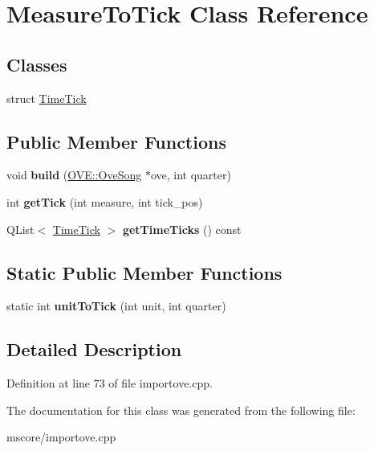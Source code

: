 \hypertarget{class_measure_to_tick}{}\section{Measure\+To\+Tick Class Reference}
\label{class_measure_to_tick}
\subsection*{Classes}
\begin{DoxyCompactItemize}
\item 
struct \hyperlink{struct_measure_to_tick_1_1_time_tick}{Time\+Tick}
\end{DoxyCompactItemize}
\subsection*{Public Member Functions}
\begin{DoxyCompactItemize}
\item 
\mbox{\label{class_measure_to_tick_a9a891a30319eabf0fb2f07f47308f732}} 
void {\bfseries build} (\hyperlink{class_o_v_e_1_1_ove_song}{O\+V\+E\+::\+Ove\+Song} $\ast$ove, int quarter)
\item 
\mbox{\label{class_measure_to_tick_ac66aec6a0079e5a0aeb32bcdde445256}} 
int {\bfseries get\+Tick} (int measure, int tick\+\_\+pos)
\item 
\mbox{\label{class_measure_to_tick_a0ff49714d5337ed11d03f842afdc93ff}} 
Q\+List$<$ \hyperlink{struct_measure_to_tick_1_1_time_tick}{Time\+Tick} $>$ {\bfseries get\+Time\+Ticks} () const
\end{DoxyCompactItemize}
\subsection*{Static Public Member Functions}
\begin{DoxyCompactItemize}
\item 
\mbox{\label{class_measure_to_tick_a618879bf8cbb9258d3c428abb4f13a26}} 
static int {\bfseries unit\+To\+Tick} (int unit, int quarter)
\end{DoxyCompactItemize}


\subsection{Detailed Description}


Definition at line 73 of file importove.\+cpp.



The documentation for this class was generated from the following file\+:\begin{DoxyCompactItemize}
\item 
mscore/importove.\+cpp\end{DoxyCompactItemize}
